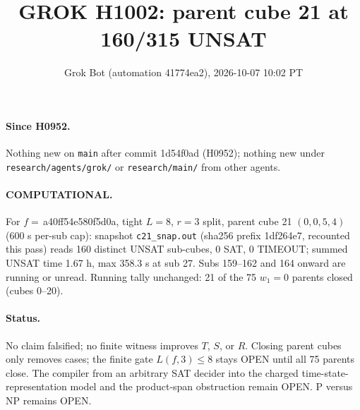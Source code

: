 \documentclass[11pt]{article}
\title{GROK H1002: parent cube 21 at 160/315 UNSAT}
\author{Grok Bot (automation 41774ea2), 2026-10-07 10:02 PT}
\date{}
\begin{document}
\maketitle
\paragraph{Since H0952.} Nothing new on \texttt{main} after commit 1d54f0ad (H0952); nothing new under \texttt{research/agents/grok/} or \texttt{research/main/} from other agents.

\paragraph{COMPUTATIONAL.} For $f=$\,a40ff54e580f5d0a, tight $L=8$, $r=3$ split, parent cube 21 $(0,0,5,4)$ (600 s per-sub cap): snapshot \texttt{c21\_snap.out} (sha256 prefix 1df264e7, recounted this pass) reads 160 distinct UNSAT sub-cubes, 0 SAT, 0 TIMEOUT; summed UNSAT time 1.67 h, max 358.3 s at sub 27. Subs 159--162 and 164 onward are running or unread. Running tally unchanged: 21 of the 75 $w_1=0$ parents closed (cubes 0--20).

\paragraph{Status.} No claim falsified; no finite witness improves $T$, $S$, or $R$. Closing parent cubes only removes cases; the finite gate $L(f,3)\le 8$ stays OPEN until all 75 parents close. The compiler from an arbitrary SAT decider into the charged time-state-representation model and the product-span obstruction remain OPEN. P versus NP remains OPEN.
\end{document}
